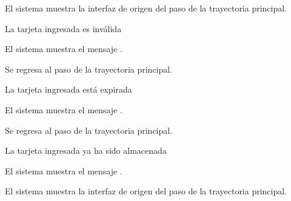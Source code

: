 {\begin{trayectoriaAlternativa}
    \item El sistema muestra la interfaz de origen del paso
       de la trayectoria principal.

  \end{trayectoriaAlternativa}


  \begin{trayectoriaAlternativa}
    {La tarjeta ingresada es inválida}

    \item El sistema muestra el mensaje
      .

    \item Se regresa al paso  de la trayectoria
      principal.

  \end{trayectoriaAlternativa}


  \begin{trayectoriaAlternativa}
    {La tarjeta ingresada está expirada}

    \item El sistema muestra el mensaje
      .

    \item Se regresa al paso  de la trayectoria
      principal.

  \end{trayectoriaAlternativa}


  \begin{trayectoriaAlternativa}
    {La tarjeta ingresada ya ha sido almacenada}

    \item El sistema muestra el mensaje
      .

    \item El sistema muestra la interfaz de origen del paso
       de la trayectoria principal.

  \end{trayectoriaAlternativa}

}
